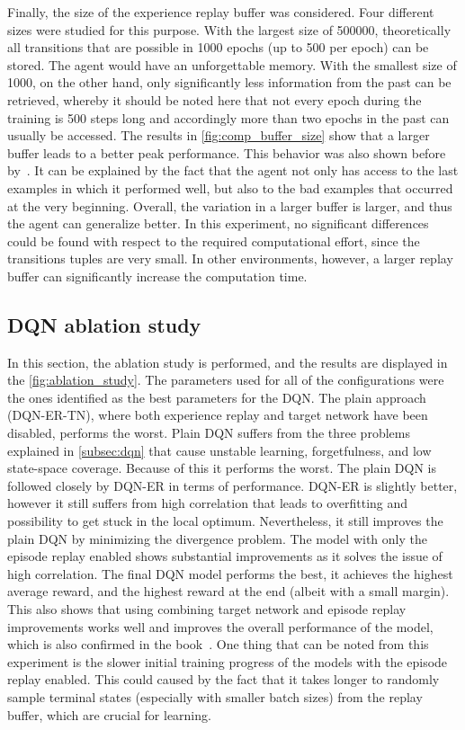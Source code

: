 \documentclass{article}
\begin{document}
Finally, the size of the experience replay buffer was considered. 
Four different sizes were studied for this purpose. 
With the largest size of 500000, theoretically all transitions that are possible in 1000 epochs (up to 500 per epoch) can be stored. 
The agent would have an unforgettable memory. 
With the smallest size of 1000, on the other hand, only significantly less information from the past can be retrieved, whereby it should be noted here that not every epoch during the training is 500 steps long and accordingly more than two epochs in the past can usually be accessed. 
The results in \autoref{fig:comp_buffer_size} show that a larger buffer leads to a better peak performance. 
This behavior was also shown before by~\cite{DBLP:conf/icml/FedusRABLRD20}. 
It can be explained by the fact that the agent not only has access to the last examples in which it performed well, but also to the bad examples that occurred at the very beginning. Overall, the variation in a larger buffer is larger, and thus the agent can generalize better. 
In this experiment, no significant differences could be found with respect to the required computational effort, since the transitions tuples are very small. In other environments, however, a larger replay buffer can significantly increase the computation time.


\subsection{DQN ablation study}
\label{subsec:dqn-ablation-study}
In this section, the ablation study is performed, and the results are displayed in the \autoref{fig:ablation_study}.
The parameters used for all of the configurations were the ones identified as the best parameters for the DQN\@.
The plain approach (DQN-ER-TN), where both experience replay and target network have been disabled, performs the worst.
Plain DQN suffers from the three problems explained in \autoref{subsec:dqn} that cause unstable learning, forgetfulness,
and low state-space coverage.
Because of this it performs the worst.
The plain DQN is followed closely by DQN-ER in terms of performance.
DQN-ER is slightly better, however it still suffers from high correlation that leads to overfitting and possibility to
get stuck in the local optimum.
Nevertheless, it still improves the plain DQN by minimizing the divergence problem.
The model with only the episode replay enabled shows substantial improvements as it solves the issue of high correlation.
The final DQN model performs the best, it achieves the highest average reward, and the highest reward at the end
(albeit with a small margin).
This also shows that using combining target network and episode replay improvements works well and improves
the overall performance of the model, which is also confirmed in the book~\cite{DBLP:books/sp/Plaat22}.
One thing that can be noted from this experiment is the slower initial training progress of the models with the episode
replay enabled.
This could caused by the fact that it takes longer to randomly sample terminal states (especially with smaller batch sizes)
from the replay buffer, which are crucial for learning.
\end{document}
